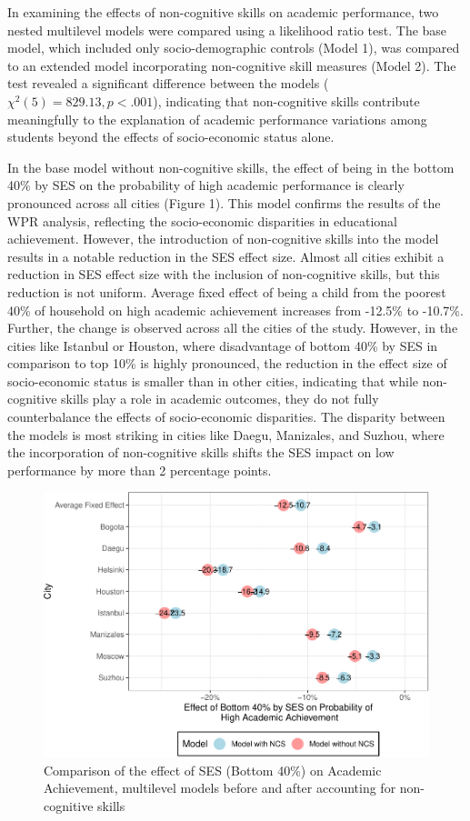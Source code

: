 \documentclass{article}
\begin{document}
In examining the effects of non-cognitive skills on academic
performance, two nested multilevel models were compared using a
likelihood ratio test. The base model, which included only
socio-demographic controls (Model 1), was compared to an extended model
incorporating non-cognitive skill measures (Model 2). The test revealed
a significant difference between the models
(\(\chi^2(5) = 829.13, p < .001\)), indicating that non-cognitive skills
contribute meaningfully to the explanation of academic performance
variations among students beyond the effects of socio-economic status
alone.

In the base model without non-cognitive skills, the effect of being in
the bottom 40\% by SES on the probability of high academic performance
is clearly pronounced across all cities (Figure 1). This model confirms
the results of the WPR analysis, reflecting the socio-economic
disparities in educational achievement. However, the introduction of
non-cognitive skills into the model results in a notable reduction in
the SES effect size. Almost all cities exhibit a reduction in SES effect
size with the inclusion of non-cognitive skills, but this reduction is
not uniform. Average fixed effect of being a child from the poorest 40\%
of household on high academic achievement increases from -12.5\% to
-10.7\%. Further, the change is observed across all the cities of the
study. However, in the cities like Istanbul or Houston, where
disadvantage of bottom 40\% by SES in comparison to top 10\% is highly
pronounced, the reduction in the effect size of socio-economic status is
smaller than in other cities, indicating that while non-cognitive skills
play a role in academic outcomes, they do not fully counterbalance the
effects of socio-economic disparities. The disparity between the models
is most striking in cities like Daegu, Manizales, and Suzhou, where the
incorporation of non-cognitive skills shifts the SES impact on low
performance by more than 2 percentage points.

\begin{figure}
\centering
\includegraphics{working_paper_files/figure-latex/reduce the gap-1.pdf}
\caption{Comparison of the effect of SES (Bottom 40\%) on Academic
Achievement, multilevel models before and after accounting for
non-cognitive skills}
\end{figure}
\end{document}
